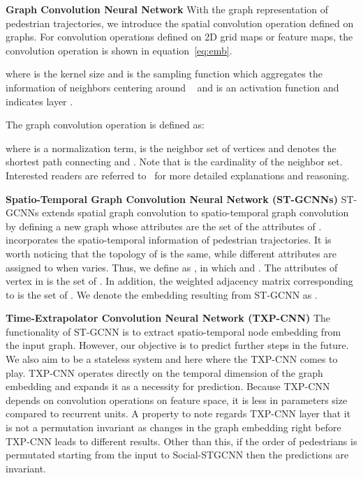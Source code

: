 \documentclass[10pt,twocolumn,letterpaper]{article}
\newcommand*{\ours}{Social-STGCNN }
\begin{document}
\noindent
\textbf{Graph Convolution Neural Network} With the graph representation of pedestrian trajectories, we introduce the spatial convolution operation defined on graphs. For convolution operations defined on 2D grid maps or feature maps, the convolution operation is shown in equation~\ref{eq:emb}. 



where  is the kernel size and  is the sampling function which aggregates the information of neighbors centering around ~\cite{dai2017deformable} and  is an activation function and  indicates layer . 

The graph convolution operation is defined as:

where  is a normalization term,   is the neighbor set of vertices  and  denotes the shortest path connecting   and . Note that  is the cardinality of the neighbor set. Interested readers are referred to~\cite{kipf2016semi, yan2018spatial} for more detailed explanations and reasoning.

\noindent
\textbf{Spatio-Temporal Graph Convolution Neural Network (ST-GCNNs)}
ST-GCNNs extends spatial graph convolution to spatio-temporal graph convolution by defining a new graph  whose attributes are the set of the attributes of .  incorporates the spatio-temporal information of pedestrian trajectories. It is worth noticing that the topology of  is the same, while different attributes are assigned to  when  varies. Thus, we define  as , in which  and . The attributes of vertex  in  is the set of . In addition, the weighted adjacency matrix  corresponding to  is the set of . We denote the embedding resulting from ST-GCNN as . 

\noindent
\textbf{Time-Extrapolator Convolution Neural Network (TXP-CNN)}
The functionality of ST-GCNN is to extract spatio-temporal node embedding from the input graph. However, our objective is to predict further steps in the future. We also aim to be a stateless system and here where the TXP-CNN comes to play. TXP-CNN operates directly on the temporal dimension of the graph embedding  and expands it as a necessity for prediction. Because TXP-CNN depends on convolution operations on feature space, it is less in parameters size compared to recurrent units. A property to note regards TXP-CNN layer that it is not a permutation invariant as changes in the graph embedding right before TXP-CNN leads to different results. Other than this, if the order of pedestrians is permutated starting from the input to \ours then the predictions are invariant.
\end{document}
